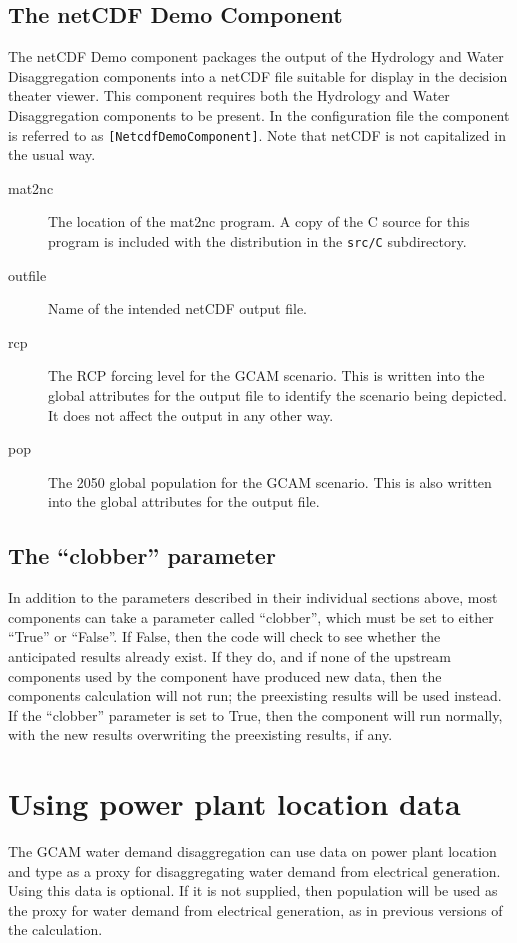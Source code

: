 \documentclass[11pt]{article}
\begin{document}
\subsection{The netCDF Demo Component}
The netCDF Demo component packages the output of the Hydrology and Water
Disaggregation components into a netCDF file suitable for display in the
decision theater viewer.  This component requires both the Hydrology and
Water Disaggregation components to be present.  In the configuration file
the component is referred to as \texttt{[NetcdfDemoComponent]}.  Note that
netCDF is not capitalized in the usual way.

\begin{description}
\item[mat2nc] The location of the mat2nc program.  A copy of the C
  source for this program is included with the distribution in the
  \texttt{src/C} subdirectory.
\item[outfile] Name of the intended netCDF output file.
\item[rcp] The RCP forcing level for the GCAM scenario.  This is
  written into the global attributes for the output file to identify
  the scenario being depicted.  It does not affect the output in any
  other way.
\item[pop] The 2050 global population for the GCAM scenario.  This is
  also written into the global attributes for the output file.
\end{description}

\subsection{The ``clobber'' parameter}
In addition to the parameters described in their individual sections
above, most components can take a parameter called ``clobber'', which
must be set to either ``True'' or ``False''.  If False, then the code
will check to see whether the anticipated results already exist.  If
they do, and if none of the upstream components used by the component have
produced new data, then the components calculation will not run; the
preexisting results will be used instead.  If the ``clobber''
parameter is set to True, then the component will run normally, with the
new results overwriting the preexisting results, if any.

\section{Using power plant location data}
\label{sec:pplant}
The GCAM water demand disaggregation can use data on power plant
location and type as a proxy for disaggregating water demand from
electrical generation.  Using this data is optional.  If it is not
supplied, then population will be used as the proxy for water demand
from electrical generation, as in previous versions of the
calculation.
\end{document}
